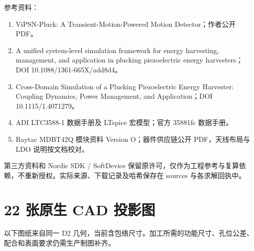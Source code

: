 \documentclass[UTF8,fontset=fandol,11pt]{ctexart}
\begin{document}
参考资料：
\begin{enumerate}
\item ViPSN-Pluck: A Transient-Motion-Powered Motion Detector；作者公开 PDF。
\item A unified system-level simulation framework for energy harvesting, management, and application in plucking piezoelectric energy harvesters；DOI 10.1088/1361-665X/add8d4。
\item Cross-Domain Simulation of a Plucking Piezoelectric Energy Harvester: Coupling Dynamics, Power Management, and Application；DOI 10.1115/1.4071279。
\item ADI LTC3588-1 数据手册及 LTspice 宏模型；官方 35881fc 数据手册。
\item Raytac MDBT42Q 模块资料 Version O；器件供应链公开 PDF，天线布局与 LDO 说明按文档校对。
\end{enumerate}
第三方资料和 Nordic SDK / SoftDevice 保留原许可，仅作为工程参考与复算依赖，不重新授权。实际来源、下载记录及哈希保存在 sources 与各求解回执中。
\appendix\section{22 张原生 CAD 投影图}
以下图纸来自同一 D2 几何，当前含包络尺寸。加工所需的功能尺寸、孔位公差、配合和表面要求仍需生产制图补齐。
\end{document}
